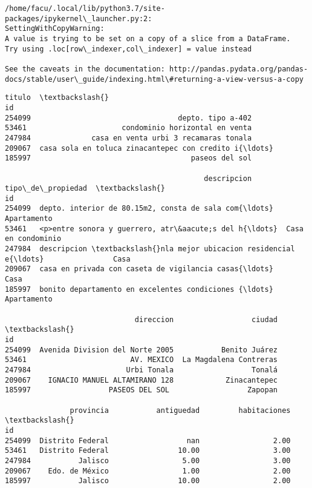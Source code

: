 \documentclass[11pt]{article}
\newcommand{\prompt}[4]{
        \llap{{\color{#2}[#3]: #4}}\vspace{-1.25em}
    }
\begin{document}
    \begin{Verbatim}[commandchars=\\\{\}]
/home/facu/.local/lib/python3.7/site-packages/ipykernel\_launcher.py:2:
SettingWithCopyWarning:
A value is trying to be set on a copy of a slice from a DataFrame.
Try using .loc[row\_indexer,col\_indexer] = value instead

See the caveats in the documentation: http://pandas.pydata.org/pandas-
docs/stable/user\_guide/indexing.html\#returning-a-view-versus-a-copy

\end{Verbatim}

            \begin{tcolorbox}[breakable, boxrule=.5pt, size=fbox, pad at break*=1mm, opacityfill=0]
\prompt{Out}{outcolor}{91}{\hspace{3.5pt}}
\begin{Verbatim}[commandchars=\\\{\}]
                                                   titulo  \textbackslash{}
id
254099                                  depto. tipo a-402
53461                      condominio horizontal en venta
247984              casa en venta urbi 3 recamaras tonala
209067  casa sola en toluca zinacantepec con credito i{\ldots}
185997                                     paseos del sol

                                              descripcion   tipo\_de\_propiedad  \textbackslash{}
id
254099  depto. interior de 80.15m2, consta de sala com{\ldots}         Apartamento
53461   <p>entre sonora y guerrero, atr\&aacute;s del h{\ldots}  Casa en condominio
247984  descripcion \textbackslash{}nla mejor ubicacion residencial e{\ldots}                Casa
209067  casa en privada con caseta de vigilancia casas{\ldots}                Casa
185997  bonito departamento en excelentes condiciones {\ldots}         Apartamento

                              direccion                  ciudad  \textbackslash{}
id
254099  Avenida Division del Norte 2005           Benito Juárez
53461                        AV. MEXICO  La Magdalena Contreras
247984                      Urbi Tonala                  Tonalá
209067    IGNACIO MANUEL ALTAMIRANO 128            Zinacantepec
185997                  PASEOS DEL SOL                  Zapopan

               provincia           antiguedad         habitaciones  \textbackslash{}
id
254099  Distrito Federal                  nan                 2.00
53461   Distrito Federal                10.00                 3.00
247984           Jalisco                 5.00                 3.00
209067    Edo. de México                 1.00                 2.00
185997           Jalisco                10.00                 2.00


\end{Verbatim}
\end{tcolorbox}
\end{document}
